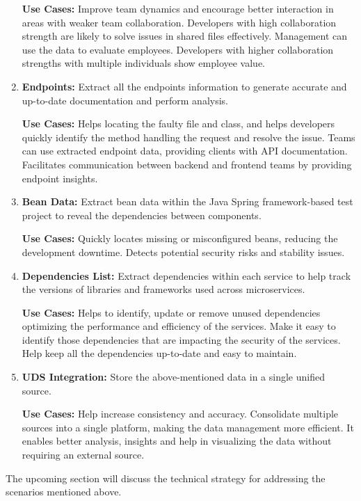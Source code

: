 \begin{enumerate}[before={\vspace{10pt}}, after={\vspace{10pt}}, itemsep=10pt, nosep, leftmargin=\parindent, labelindent=0pt]
    \textbf{Use Cases:} Improve team dynamics and encourage better interaction in areas with weaker team collaboration. Developers with high collaboration strength are likely to solve issues in shared files effectively. Management can use the data to evaluate employees. Developers with higher collaboration strengths with multiple individuals show employee value.
    \vspace{10pt}
    \item \textbf{Endpoints:} Extract all the endpoints information to generate accurate and up-to-date documentation and perform analysis.
    
    \textbf{Use Cases:} Helps locating the faulty file and class, and helps developers quickly identify the method handling the request and resolve the issue. Teams can use extracted endpoint data, providing clients with API documentation. Facilitates communication between backend and frontend teams by providing endpoint insights.
    \vspace{10pt}
    \item \textbf{Bean Data:} Extract bean data within the Java Spring framework-based test project to reveal the dependencies between components.
    
    \textbf{Use Cases:} Quickly locates missing or misconfigured beans, reducing the development downtime. Detects potential security risks and stability issues.
    \vspace{10pt}
    \item \textbf{Dependencies List:} Extract dependencies within each service to help track the versions of libraries and frameworks used across microservices.
    
    \textbf{Use Cases:} Helps to identify, update or remove unused dependencies optimizing the performance and efficiency of the services. Make it easy to identify those dependencies that are impacting the security of the services. Help keep all the dependencies up-to-date and easy to maintain.
    \vspace{10pt}
    \item \textbf{UDS Integration:} Store the above-mentioned data in a single unified source.
    
    \textbf{Use Cases:} Help increase consistency and accuracy. Consolidate multiple sources into a single platform, making the data management more efficient. It enables better analysis, insights and help in visualizing the data without requiring an external source.
\end{enumerate}

The upcoming section will discuss the technical strategy for addressing the scenarios mentioned above.